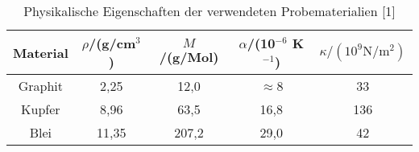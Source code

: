 \begin{table}[h]
	\begin{center}
		\begin{tabular}{c|cccc}
			Material&$\rho$/(g/cm$^3$)&$M$/(g/Mol)&$\alpha$/(10$^{-6}$ K$^{-1}$)&$\kappa/(10^9\text{N}/\text{m}^2)$ \\ \hline
			Graphit&2,25&12,0&$\approx$8&33\\
			Kupfer&8,96&63,5&16,8&136\\
			Blei&11,35&207,2&29,0&42
		\end{tabular}
		\caption{Physikalische Eigenschaften der verwendeten Probematerialien [1]}
		\label{tablitdata}
	\end{center}
\end{table}